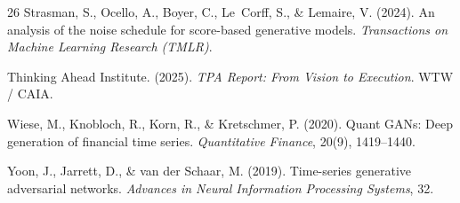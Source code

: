 \documentclass[11pt,a4paper]{article}
\begin{document}
\begin{thebibliography}{26}
Strasman, S., Ocello, A., Boyer, C., Le~Corff, S., \& Lemaire, V. (2024).
An analysis of the noise schedule for score-based generative models.
\emph{Transactions on Machine Learning Research (TMLR)}.

Thinking Ahead Institute. (2025).
\emph{TPA Report: From Vision to Execution}. WTW / CAIA.

Wiese, M., Knobloch, R., Korn, R., \& Kretschmer, P. (2020).
Quant GANs: Deep generation of financial time series.
\emph{Quantitative Finance}, 20(9), 1419--1440.

Yoon, J., Jarrett, D., \& van der Schaar, M. (2019).
Time-series generative adversarial networks.
\emph{Advances in Neural Information Processing Systems}, 32.

\end{thebibliography}
\end{document}
